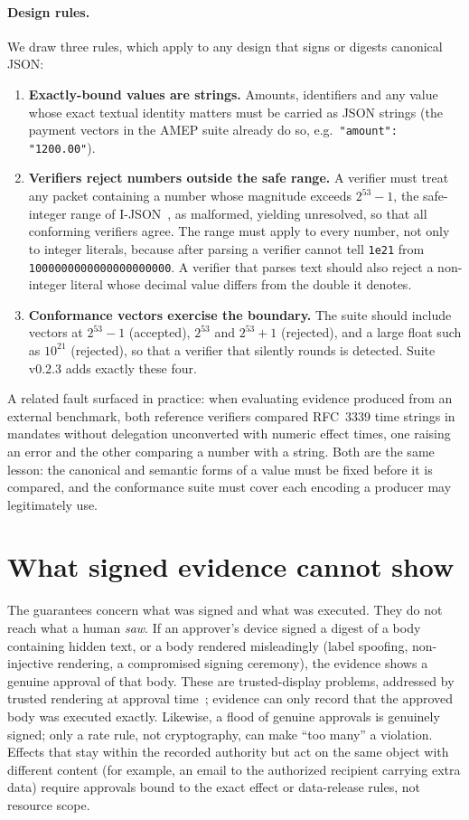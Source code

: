 \documentclass[11pt,a4paper]{article}
\theoremstyle{definition}
\theoremstyle{remark}
\newcommand{\unres}{\textsf{unresolved}}
\newcommand{\code}[1]{\texttt{#1}}
\begin{document}
\paragraph{Design rules.} We draw three rules, which apply to any design that signs or digests canonical JSON:
\begin{enumerate}
\item \textbf{Exactly-bound values are strings.} Amounts, identifiers and any value whose exact textual identity matters must be carried as JSON strings (the payment vectors in the AMEP suite already do so, e.g.\ \code{"amount": "1200.00"}).
\item \textbf{Verifiers reject numbers outside the safe range.} A verifier must treat any packet containing a number whose magnitude exceeds $2^{53}-1$, the safe-integer range of I-JSON~\cite{rfc7493}, as malformed, yielding \unres{}, so that all conforming verifiers agree. The range must apply to every number, not only to integer literals, because after parsing a verifier cannot tell \code{1e21} from \code{1000000000000000000000}. A verifier that parses text should also reject a non-integer literal whose decimal value differs from the double it denotes.
\item \textbf{Conformance vectors exercise the boundary.} The suite should include vectors at $2^{53}-1$ (accepted), $2^{53}$ and $2^{53}+1$ (rejected), and a large float such as $10^{21}$ (rejected), so that a verifier that silently rounds is detected. Suite v0.2.3 adds exactly these four.
\end{enumerate}
A related fault surfaced in practice: when evaluating evidence produced from an external benchmark, both reference verifiers compared RFC~3339 time strings in mandates without delegation unconverted with numeric effect times, one raising an error and the other comparing a number with a string. Both are the same lesson: the canonical and semantic forms of a value must be fixed before it is compared, and the conformance suite must cover each encoding a producer may legitimately use.

\section{What signed evidence cannot show}\label{sec:limits}

The guarantees concern what was signed and what was executed. They do not reach what a human \emph{saw}. If an approver's device signed a digest of a body containing hidden text, or a body rendered misleadingly (label spoofing, non-injective rendering, a compromised signing ceremony), the evidence shows a genuine approval of that body. These are trusted-display problems, addressed by trusted rendering at approval time~\cite{kodathala2026approve}; evidence can only record that the approved body was executed exactly. Likewise, a flood of genuine approvals is genuinely signed; only a rate rule, not cryptography, can make ``too many'' a violation. Effects that stay within the recorded authority but act on the same object with different content (for example, an email to the authorized recipient carrying extra data) require approvals bound to the exact effect or data-release rules, not resource scope.
\end{document}
